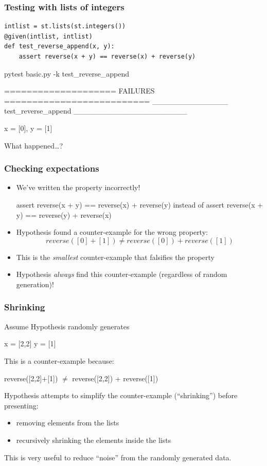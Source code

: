 \documentclass{beamer}
\begin{document}
\begin{frame}[fragile]
  \frametitle{Testing with lists of integers}

\begin{verbatim}
intlist = st.lists(st.integers())
@given(intlist, intlist)
def test_reverse_append(x, y):
    assert reverse(x + y) == reverse(x) + reverse(y)
\end{verbatim}
\medskip
\pause
  
\begin{semiverbatim}
pytest basic.py -k test_reverse_append

==================== FAILURES ==========================
\alert{______________ test_reverse_append _____________________}

x = [0], y = [1]
\end{semiverbatim}
What happened\ldots ?  
\end{frame}

\begin{frame}[fragile]
  \frametitle{Checking expectations}


\begin{itemize}
\item We've written the property incorrectly!
\begin{semiverbatim}
  assert reverse(x + y) == reverse(\alert{x}) + reverse(\alert{y})
      \textsf{instead of}
  assert reverse(x + y) == reverse(y) + reverse(x)  
\end{semiverbatim}
\item Hypothesis found a counter-example for the wrong property:
   \[ reverse([0]+[1]) \neq reverse([0]) + reverse([1]) \]
\item This is the \emph{smallest} counter-example
  that falsifies the property
\item Hypothesis \emph{always} find this counter-example
  (regardless of random generation)!
\end{itemize}
\end{frame}

\begin{frame}
  \frametitle{Shrinking}

Assume Hypothesis randomly generates
\begin{semiverbatim}
x = [2,2]
y = [1]
\end{semiverbatim}
This is a counter-example because:
\begin{semiverbatim}
      reverse([2,2]+[1]) \ensuremath{\neq}  reverse([2,2]) + reverse([1])
\end{semiverbatim}
\medskip

Hypothesis attempts to simplify
the counter-example (``shrinking'')
before presenting:
\begin{itemize}
\item removing elements from the lists
\item recursively shrinking the elements inside the lists
\end{itemize}
This is very useful to reduce ``noise'' from the randomly generated data.
\end{frame}
\end{document}

